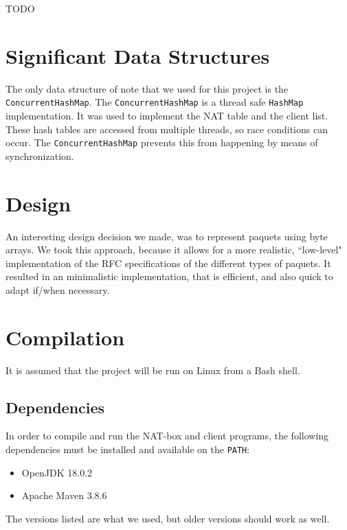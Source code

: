\documentclass[10pt, a4paper]{article}
\begin{document}
TODO



\section{Significant Data Structures}
\label{sec:sigds}

The only data structure of note that we used for this project is the
\texttt{ConcurrentHashMap}. The \texttt{ConcurrentHashMap} is a thread safe
\texttt{HashMap} implementation. It was used to implement the NAT table and the
client list. These hash tables are accessed from multiple threads, so race
conditions can occur. The \texttt{ConcurrentHashMap} prevents this from
happening by means of synchronization.



\section{Design}
\label{sec:design}

An interesting design decision we made, was to represent paquets using byte
arrays. We took this approach, because it allows for a more realistic,
``low-level" implementation of the RFC specifications of the different types of
paquets. It resulted in an minimalistic implementation, that is efficient, and
also quick to adapt if/when necessary.



\section{Compilation}
\label{sec:comp}

It is assumed that the project will be run on Linux from a Bash shell.


\subsection{Dependencies}
\label{ssec:deps}

In order to compile and run the NAT-box and client programs, the following
dependencies must be installed and available on the \texttt{PATH}:
\begin{itemize}
  \item OpenJDK 18.0.2
  \item Apache Maven 3.8.6
\end{itemize}
The versions listed are what we used, but older versions should work as well.
\end{document}
